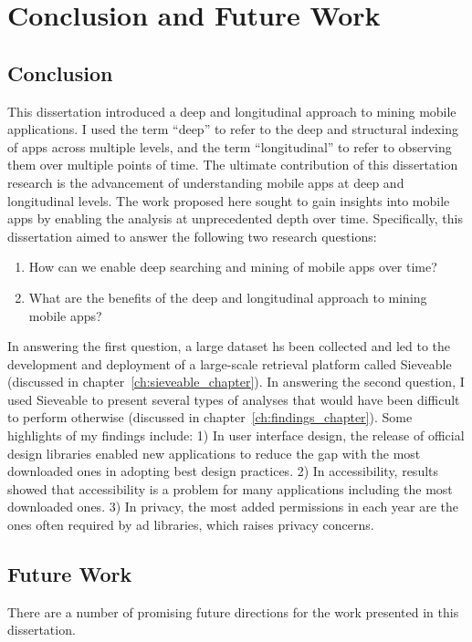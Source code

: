 \chapter{Conclusion and Future Work}
\label{ch:conclusion}

\section{Conclusion}
This dissertation introduced a deep and longitudinal approach to mining mobile applications.
I used the term ``deep'' to refer to the deep and structural indexing of apps across multiple levels, and the term ``longitudinal'' to refer to observing them over multiple points of time.
The ultimate contribution of this dissertation research is the advancement of understanding mobile apps at deep and longitudinal levels.
The work proposed here sought to gain insights into mobile apps by enabling the analysis at unprecedented depth over time.
Specifically, this dissertation aimed to answer the following two research questions:
\begin{enumerate}
	\item How can we enable deep searching and mining of mobile apps over time?
	\item What are the benefits of the deep and longitudinal approach to mining mobile apps?
\end{enumerate}
In answering the first question, a large dataset hs been collected and led to the development and deployment of a large-scale retrieval platform called Sieveable (discussed in chapter~\ref{ch:sieveable_chapter}).
In answering the second question, I used Sieveable to present several types of analyses that would have been difficult to perform otherwise  (discussed in chapter~\ref{ch:findings_chapter}).
Some highlights of my findings include:
1) In user interface design, the release of official design libraries enabled new applications to reduce the gap with the most downloaded ones in adopting best design practices.
2) In accessibility, results showed that accessibility is a problem for many applications including the most downloaded ones.
3) In privacy, the most added permissions in each year are the ones often required by ad libraries, which raises privacy concerns.

\section{Future Work}
There are a number of promising future directions for the work presented in this dissertation.

